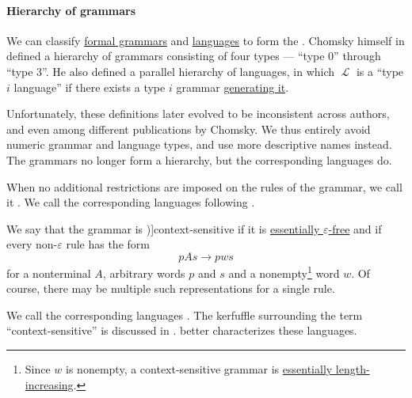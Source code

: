 \paragraph{Hierarchy of grammars}

\begin{definition}\label{def:chomsky_hierarchy}
  We can classify \hyperref[def:formal_grammar]{formal grammars} and \hyperref[def:formal_language]{languages} to form the . Chomsky himself in \cite[def. 6]{Chomsky1959} defined a hierarchy of grammars consisting of four types --- \enquote{type 0} through \enquote{type 3}. He also defined a parallel hierarchy of languages, in which \( \mscrL \) is a \enquote{type \( i \) language} if there exists a type \( i \) grammar \hyperref[def:formal_grammar/language]{generating it}.

  Unfortunately, these definitions later evolved to be inconsistent across authors, and even among different publications by Chomsky. We thus entirely avoid numeric grammar and language types, and use more descriptive names instead. The grammars no longer form a hierarchy, but the corresponding languages do.

  \begin{thmenum}
     When no additional restrictions are imposed on the rules of the grammar, we call it . We call the corresponding languages  following \cite[thm 5.4.1; thm 5.4.2]{Savage1998}.

     We say that the grammar is \term[ru=грамматика составляющих (\cite[29]{Гладкий1973Языки})]{context-sensitive} if it is \hyperref[def:epsilon_free_grammar]{essentially \( \varepsilon \)-free} and if every non-\( \varepsilon \) rule has the form
    \begin{equation*}
      p A s \to p w s
    \end{equation*}
    for a nonterminal \( A \), arbitrary words \( p \) and \( s \) and a nonempty\footnote{Since \( w \) is nonempty, a context-sensitive grammar is \hyperref[def:length_increasing_grammar]{essentially length-increasing}.} word \( w \). Of course, there may be multiple such representations for a single rule.

    We call the corresponding languages . The kerfuffle surrounding the term \enquote{context-sensitive} is discussed in .  better characterizes these languages.


\end{thmenum}
\end{definition}
